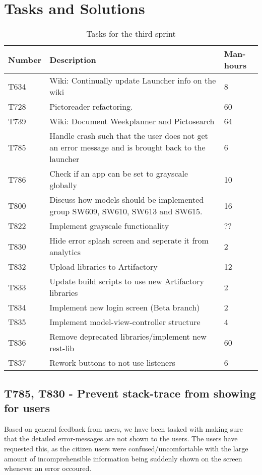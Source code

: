 \section{Tasks and Solutions}
\begin{table}[H]
\begin{centering}
\begin{tabular}{|l|p{9cm}|l|}
\hline
Number 	& Description & Man-hours \\ \hline
T634   	& Wiki: Continually update Launcher info on the wiki & 8\\\hline
T728  	& Pictoreader refactoring. & 60 \\ \hline
T739	& Wiki: Document Weekplanner and Pictosearch & 64\\ \hline
T785	& Handle crash such that the user does not get an error message and is
		  brought back to the launcher & 6\\ \hline
T786 	& Check if an app can be set to grayscale globally & 10\\ \hline
T800 	& Discuss how models should be implemented group SW609, SW610, SW613 and
		  SW615. & 16\\ \hline
T822 	& Implement grayscale functionality & ??\\ \hline
T830 	& Hide error splash screen and seperate it from analytics & 2\\ \hline
T832 	& Upload libraries to Artifactory & 12\\ \hline
T833 	& Update build scripts to use new Artifactory libraries & 2\\ \hline
T834 	& Implement new login screen (Beta branch) & 2\\ \hline
T835 	& Implement model-view-controller structure & 4\\ \hline
T836 	& Remove deprecated libraries/implement new rest-lib & 60\\ \hline
T837 	& Rework buttons to not use listeners & 6\\ \hline
\end{tabular}
\caption{Tasks for the third sprint}
\label{Tasks3}
\end{centering}
\end{table}

\subsection{T785, T830 - Prevent stack-trace from showing for users}
Based on general feedback from users, we have been tasked with making sure that
the detailed error-messages are not shown to the users. The users have requested
this, as the citizen users were confused/uncomfortable with the large amount of
incomprehensible information being suddenly shown on the screen whenever an
error occoured.\nl

